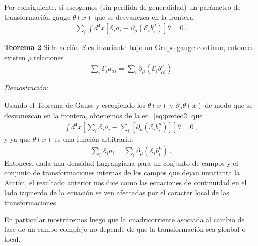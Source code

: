 \begin{frame}
Por consiguiente, si escogemos (sin perdida de generalidad) un parámetro de transformación gauge $\theta(x)$ que se desvanezca en la frontera
\begin{align}
  \label{eq:preteo2}
\sum_i\int {d^4}x \left[ \mathcal{E}_ia_i -  \partial_{\mu}   \left(  \mathcal{E}_i b^{\mu}_i  \right) \right]  \theta   =0\,.
\end{align}

\end{frame}


\begin{frame}
\textbf{Teorema 2} Si la acción $S$ es invariante bajo un Grupo gauge continuo, entonces existen $\rho$ relaciones
\begin{align}
  \sum_{i}\mathcal{E}_{i} a_{\alpha i}=\sum_{i} \partial_{\mu} \left( \mathcal{E}_{i} b^{\mu}_{\alpha i} \right)
\end{align}
\end{frame}
\emph{Demostración}:

Usando el Teorema de Gauss y escogiendo los $\theta(x)$ y $\partial_{\mu}\theta(x)$ de modo que se desvanezcan en la frontera, obtenemos de la ec.~\eqref{eq:preteo2} que
\begin{align*}
\int {d^4}x \left[    \sum_i  \mathcal{E}_ia_i -\sum_i  \left[ \partial_{\mu}   \left(  \mathcal{E}_i b^{\mu}_i  \right) \right] \right]\theta   =0\,,
\end{align*}
y ya que $\theta(x)$ es una función arbitraria:
\begin{align}
  \sum_i \mathcal{E}_ia_i=\sum_i  \partial_{\mu}   \left(  \mathcal{E}_i b^{\mu}_i  \right) \,.
\end{align}
Entonces, dada una densidad Lagrangiana para un conjunto de campos y el conjunto de transformaciones internas de los campos que dejan invarianta la Acción, el resultado anterior nos dice como las ecuaciones de continuidad en el lado izquierdo de la ecuación se ven afectadas por el caracter local de las transformaciones.

En particular mostraremos luego  que la cuadricorriente asociada al cambio de fase de un campo complejo no depende de que la transformación sea gloabal o local.







